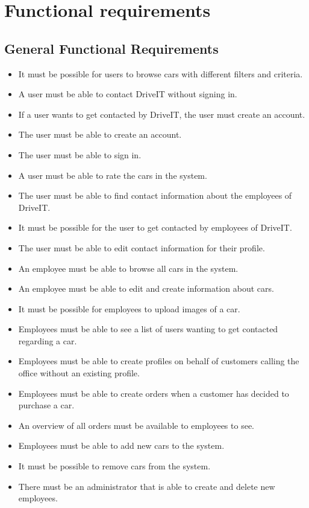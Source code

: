 \section{Functional requirements}

\subsection{General Functional Requirements}
\begin{itemize}
    \item It must be possible for users to browse cars with different filters and criteria.
    \item A user must be able to contact DriveIT without signing in.
    \item If a user wants to get contacted by DriveIT, the user must create an account.
    \item The user must be able to create an account.
    \item The user must be able to sign in.
    \item A user must be able to rate the cars in the system.
    \item The user must be able to find contact information about the employees of DriveIT.
    \item It must be possible for the user to get contacted by employees of DriveIT.
    \item The user must be able to edit contact information for their profile.
    \item An employee must be able to browse all cars in the system.
    \item An employee must be able to edit and create information about cars.
    \item It must be possible for employees to upload images of a car.
    \item Employees must be able to see a list of users wanting to get contacted regarding a car.
    \item Employees must be able to create profiles on behalf of customers calling the office without an existing profile.
    \item Employees must be able to create orders when a customer has decided to purchase a car.
    \item An overview of all orders must be available to employees to see.
    \item Employees must be able to add new cars to the system.
    \item It must be possible to remove cars from the system.
    \item There must be an administrator that is able to create and delete new employees.
\end{itemize}

